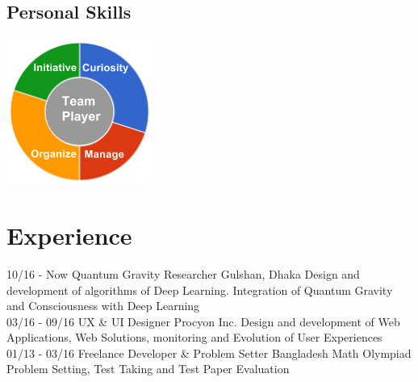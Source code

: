 \documentclass[]{friggeri-cv}
\begin{document}
\begin{aside}
  \section{Personal Skills}
    \includegraphics[scale=0.62]{img/personal.png}
    ~
\end{aside}

\section{Experience}
\begin{entrylist}
  \entry
    {10/16 - Now}
    {Quantum Gravity Researcher}
    {Gulshan, Dhaka}
    {Design and development of algorithms of Deep Learning. Integration of Quantum Gravity and Consciousness with Deep Learning\\}
  \entry
    {03/16 - 09/16}
    {UX \& UI Designer}
    {Procyon Inc.}
    {Design and development of Web Applications, Web Solutions, monitoring and Evolution of User Experiences\\}
    \entry
    {01/13 - 03/16}
    {Freelance Developer \& Problem Setter}
    {Bangladesh Math Olympiad}
    {Problem Setting, Test Taking and Test Paper Evaluation\\}
\end{entrylist}
\end{document}
